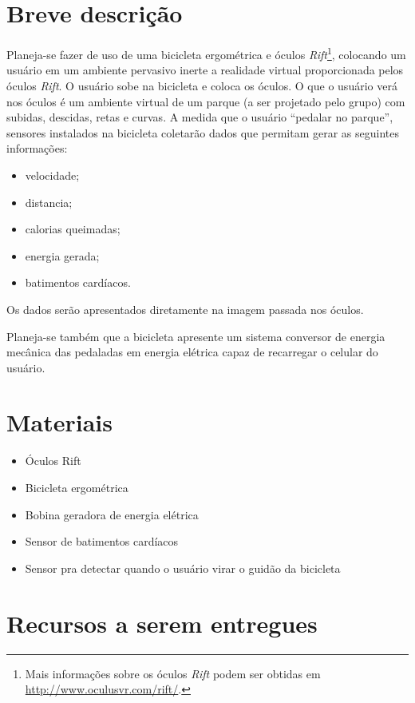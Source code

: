 \section{Breve descrição}\label{sec}

Planeja-se fazer de uso de  uma bicicleta ergométrica e óculos \textit{Rift}\footnote{Mais informações sobre os óculos \textit{Rift} podem ser obtidas em  \url{http://www.oculusvr.com/rift/}.}, colocando
um usuário em um ambiente pervasivo inerte a realidade virtual proporcionada pelos óculos \textit{Rift}. O usuário sobe na bicicleta e coloca os óculos. 
O que o usuário verá nos óculos é um ambiente virtual de um parque (a ser projetado pelo grupo)
com subidas, descidas, retas e curvas. A medida que o usuário “pedalar no parque”,
sensores instalados na bicicleta coletarão dados que permitam gerar as seguintes informações:
\begin{itemize}
	\item velocidade;
	\item distancia;
	\item calorias queimadas;
	\item energia gerada;
	\item batimentos cardíacos.
\end{itemize}

Os dados serão apresentados diretamente na imagem passada nos óculos. 

Planeja-se também que a bicicleta apresente um sistema conversor de
energia mecânica das pedaladas em energia elétrica capaz de recarregar o celular do usuário.


\section{Materiais} %
\label{sec:materiais}

\begin{itemize}%
	\item Óculos Rift \checkmark
	\item Bicicleta ergométrica \checkmark
	\item Bobina geradora de energia elétrica
	\item Sensor de batimentos cardíacos 
	\item Sensor pra detectar quando o usuário virar o guidão da bicicleta %
\end{itemize}


\section{Recursos a serem entregues}

